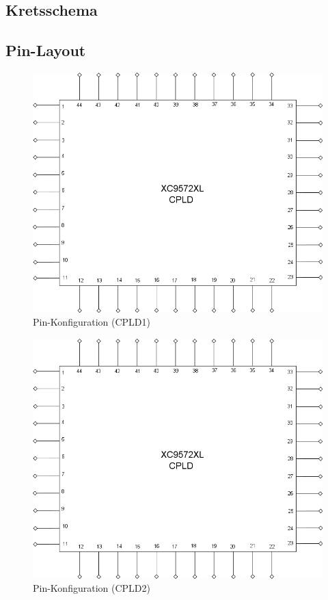 \documentclass[a4paper,11pt]{article}
\begin{document}
	\subsection{Kretsschema}

	\subsection{Pin-Layout}

		\begin{figure}[h!]
		  \centering
		      \includegraphics[scale=0.48, angle=0]{PinDiagram.png}
		  	\caption{Pin-Konfiguration (CPLD1)}
		\end{figure}

		\begin{figure}[h!]
		  \centering
		      \includegraphics[scale=0.48, angle=0]{PinDiagram.png}
		  	\caption{Pin-Konfiguration (CPLD2)}
		\end{figure}
\end{document}
